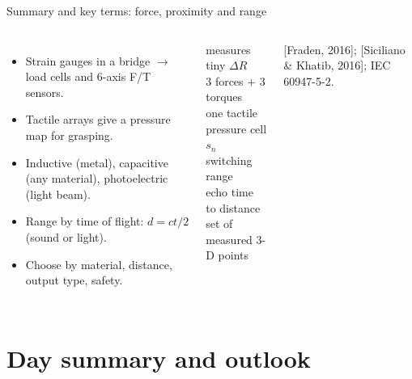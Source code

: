 \documentclass[aspectratio=169,10pt]{beamer}
\begin{document}
\begin{frame}{Summary and key terms: force, proximity and range}
\begin{columns}[T]
\begin{itemize}\small
\item Strain gauges in a bridge $\rightarrow$ load cells and 6-axis F/T sensors.
\item Tactile arrays give a pressure map for grasping.
\item Inductive (metal), capacitive (any material), photoelectric (light beam).
\item Range by time of flight: $d=ct/2$ (sound or light).
\item Choose by material, distance, output type, safety.
\end{itemize}
\begin{defbox}
\small
{} measures tiny $\Delta R$\\
 3 forces $+$ 3 torques\\
 one tactile pressure cell\\
 $s_n$ switching range\\
 echo time to distance\\
 set of measured 3-D points
\end{defbox}
{\scriptsize\color{mkGray} [Fraden, 2016]; [Siciliano \& Khatib, 2016]; IEC 60947-5-2.}
\end{columns}
\end{frame}

\section{Day summary and outlook}
\end{document}
